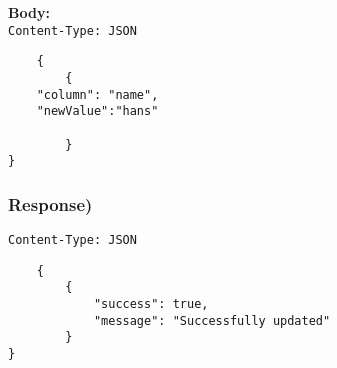 \textbf{Body:}\\
\lstinline{Content-Type: JSON}
\begin{lstlisting}
    {
        {
    "column": "name",
    "newValue":"hans"

        }
}
\end{lstlisting}

\subsubsection{Response)}

\lstinline{Content-Type: JSON}
\begin{lstlisting}
    {
        {
            "success": true,
            "message": "Successfully updated"
        }
}
\end{lstlisting}

\pagebreak

